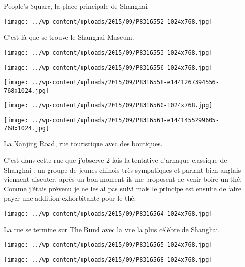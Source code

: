 \pagebreak
 People's Square, la place principale de Shanghai. 
\begin{center} \texttt{[image: ../wp-content/uploads/2015/09/P8316552-1024x768.jpg]} \end{center}

 C'est là que se trouve le Shanghai Museum.
\begin{center} \texttt{[image: ../wp-content/uploads/2015/09/P8316553-1024x768.jpg]} \end{center}
\begin{center} \texttt{[image: ../wp-content/uploads/2015/09/P8316556-1024x768.jpg]} \end{center}
\begin{center} \texttt{[image: ../wp-content/uploads/2015/09/P8316558-e1441267394556-768x1024.jpg]} \end{center}
\begin{center} \texttt{[image: ../wp-content/uploads/2015/09/P8316560-1024x768.jpg]} \end{center}
\begin{center} \texttt{[image: ../wp-content/uploads/2015/09/P8316561-e1441455299605-768x1024.jpg]} \end{center}

\pagebreak
 La Nanjing Road, rue touristique avec des boutiques. 

 C'est dans cette rue que j'observe 2 fois la tentative d'arnaque classique de Shanghai : un groupe de jeunes chinois très sympatiques et parlant bien anglais viennent discuter, après un bon moment ils me proposent de venir boire un thé. Comme j'étais prévenu je ne les ai pas suivi mais le principe est ensuite de faire payer une addition exhorbitante pour le thé. 
\begin{center} \texttt{[image: ../wp-content/uploads/2015/09/P8316564-1024x768.jpg]} \end{center}

 La rue se termine sur The Bund avec la vue la plus célèbre de Shanghai.
\begin{center} \texttt{[image: ../wp-content/uploads/2015/09/P8316565-1024x768.jpg]} \end{center}
\begin{center} \texttt{[image: ../wp-content/uploads/2015/09/P8316568-1024x768.jpg]} \end{center}

